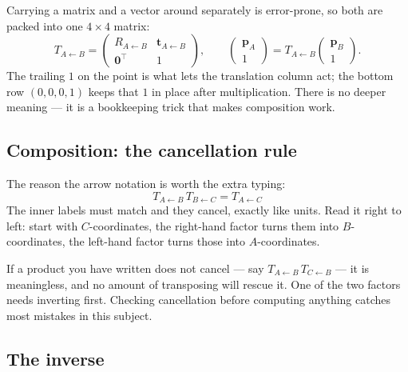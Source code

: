 \documentclass[11pt,a4paper]{article}
\newcommand{\T}[2]{T_{#1 \leftarrow #2}}   %
\newcommand{\R}[2]{R_{#1 \leftarrow #2}}
\newcommand{\vt}[1]{\mathbf{#1}}
\begin{document}
Carrying a matrix and a vector around separately is error-prone, so both are packed into
one $4\times4$ matrix:
\begin{equation}
  \T{A}{B} =
  \begin{pmatrix}
    \R{A}{B} & \vt{t}_{A\leftarrow B} \\[2pt]
    \vt{0}^{\!\top} & 1
  \end{pmatrix},
  \qquad
  \begin{pmatrix} \vt{p}_A \\ 1 \end{pmatrix}
  = \T{A}{B}
  \begin{pmatrix} \vt{p}_B \\ 1 \end{pmatrix}.
\end{equation}
The trailing $1$ on the point is what lets the translation column act; the bottom row
$(0,0,0,1)$ keeps that $1$ in place after multiplication. There is no deeper meaning ---
it is a bookkeeping trick that makes composition work.

\subsection{Composition: the cancellation rule}
\label{sec:compose}

The reason the arrow notation is worth the extra typing:
\begin{equation}
  \boxed{\;\T{A}{B}\,\T{B}{C} = \T{A}{C}\;}
  \label{eq:chain}
\end{equation}
The inner labels must match and they cancel, exactly like units. Read it right to left:
start with $C$-coordinates, the right-hand factor turns them into $B$-coordinates, the
left-hand factor turns those into $A$-coordinates.

If a product you have written does not cancel --- say $\T{A}{B}\,\T{C}{B}$ --- it is
meaningless, and no amount of transposing will rescue it. One of the two factors needs
inverting first. Checking cancellation before computing anything catches most mistakes
in this subject.

\subsection{The inverse}
\label{sec:inverse}
\end{document}
